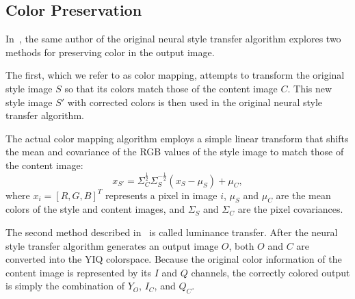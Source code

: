 \documentclass[10pt,twocolumn,letterpaper]{article}
\begin{document}
\subsection{Color Preservation}
In~\cite{gatys-color}, the same author of the original neural style transfer algorithm explores two methods for preserving color in the output image.

The first, which we refer to as color mapping, attempts to transform the original style image $S$ so that its colors match those of the content image $C$. This new style image $S'$ with corrected colors is then used in the original neural style transfer algorithm.

The actual color mapping algorithm employs a simple linear transform that shifts the mean and covariance of the RGB values of the style image to match those of the content image:
\begin{equation}\label{eq:cov}
  x_{S'} = \Sigma_C^\frac{1}{2}\Sigma_S^{-\frac{1}{2}} (x_S - \mu_S) + \mu_C,
\end{equation}
where $x_i = [R, G, B]^T$ represents a pixel in image $i$, $\mu_S$ and $\mu_C$ are the mean colors of the style and content images, and $\Sigma_S$ and $\Sigma_C$ are the pixel covariances.

The second method described in~\cite{gatys-color} is called luminance transfer. After the neural style transfer algorithm generates an output image $O$, both $O$ and $C$ are converted into the YIQ colorspace. Because the original color information of the content image is represented by its $I$ and $Q$ channels, the correctly colored output is simply the combination of $Y_O$, $I_C$, and $Q_C$.
\end{document}
